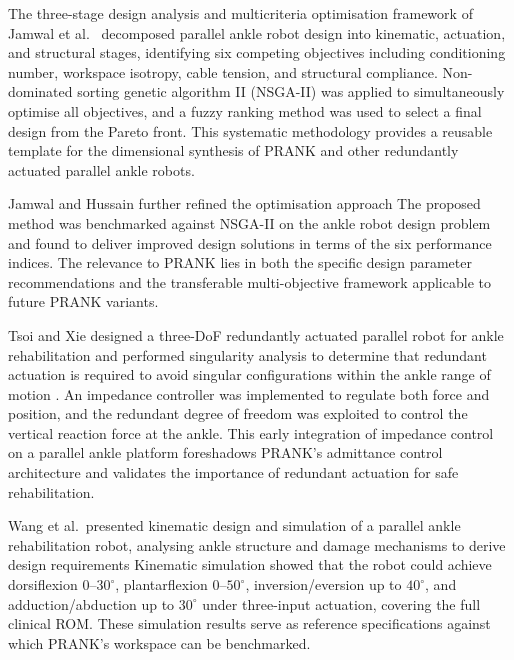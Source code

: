 The three-stage design analysis and multicriteria optimisation framework of Jamwal et al.\ \cite{Jamwal2015} decomposed parallel ankle robot design into kinematic, actuation, and structural stages, identifying six competing objectives including conditioning number, workspace isotropy, cable tension, and structural compliance.
Non-dominated sorting genetic algorithm II (NSGA-II) was applied to simultaneously optimise all objectives, and a fuzzy ranking method was used to select a final design from the Pareto front.
This systematic methodology provides a reusable template for the dimensional synthesis of PRANK and other redundantly actuated parallel ankle robots.

Jamwal and Hussain further refined the optimisation approach %
The proposed method was benchmarked against NSGA-II on the ankle robot design problem and found to deliver improved design solutions in terms of the six performance indices.
The relevance to PRANK lies in both the specific design parameter recommendations and the transferable multi-objective framework applicable to future PRANK variants.

Tsoi and Xie designed a three-DoF redundantly actuated parallel robot for ankle rehabilitation and performed singularity analysis to determine that redundant actuation is required to avoid singular configurations within the ankle range of motion \cite{Tsoi2009}.
An impedance controller was implemented to regulate both force and position, and the redundant degree of freedom was exploited to control the vertical reaction force at the ankle.
This early integration of impedance control on a parallel ankle platform foreshadows PRANK's admittance control architecture and validates the importance of redundant actuation for safe rehabilitation.

Wang et al.\ presented kinematic design and simulation of a parallel ankle rehabilitation robot, analysing ankle structure and damage mechanisms to derive design requirements %
Kinematic simulation showed that the robot could achieve dorsiflexion $0$--$30^{\circ}$, plantarflexion $0$--$50^{\circ}$, inversion/eversion up to $40^{\circ}$, and adduction/abduction up to $30^{\circ}$ under three-input actuation, covering the full clinical ROM.
These simulation results serve as reference specifications against which PRANK's workspace can be benchmarked.

